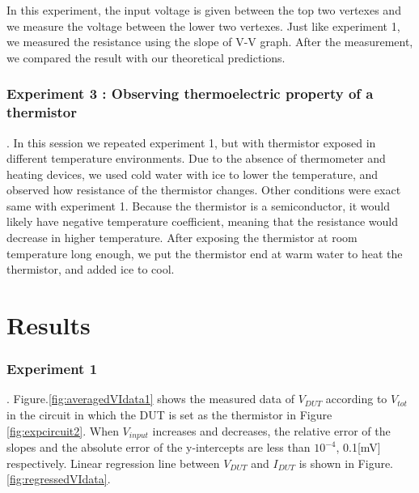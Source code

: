 \documentclass[5p,sort&compress]{elsarticle}
\begin{document}
In this experiment, the input voltage is given between the top two vertexes and we measure the voltage between the lower two vertexes. Just like experiment 1, we measured the resistance using the slope of V-V graph. After the measurement, we compared the result with our theoretical predictions.

\subsubsection{Experiment 3 : Observing thermoelectric property of a thermistor}
.\newline
In this session we repeated experiment 1, but with thermistor exposed in different temperature environments. Due to the absence of thermometer and heating devices, we used cold water with ice to lower the temperature, and observed how resistance of the thermistor changes. Other conditions were exact same with experiment 1. Because the thermistor is a semiconductor, it would likely have negative temperature coefficient, meaning that the resistance would decrease in higher temperature. After exposing the thermistor at room temperature long enough, we put the thermistor end at warm water to heat the thermistor, and added ice to cool.


\section{Results} 


\subsubsection{Experiment 1}.
\newline{}
Figure.\ref{fig:averagedVIdata1} shows the measured data of $V_{DUT}$ according to $V_{tot}$ in the circuit in which the DUT is set as the thermistor in Figure \ref{fig:expcircuit2}. When $V_{input}$ increases and decreases, the relative error of the slopes and the absolute error of the y-intercepts are less than $10^{-4}$, 0.1[mV] respectively. Linear regression line between $V_{DUT}$ and $I_{DUT}$ is shown in Figure.\ref{fig:regressedVIdata}.
\end{document}

